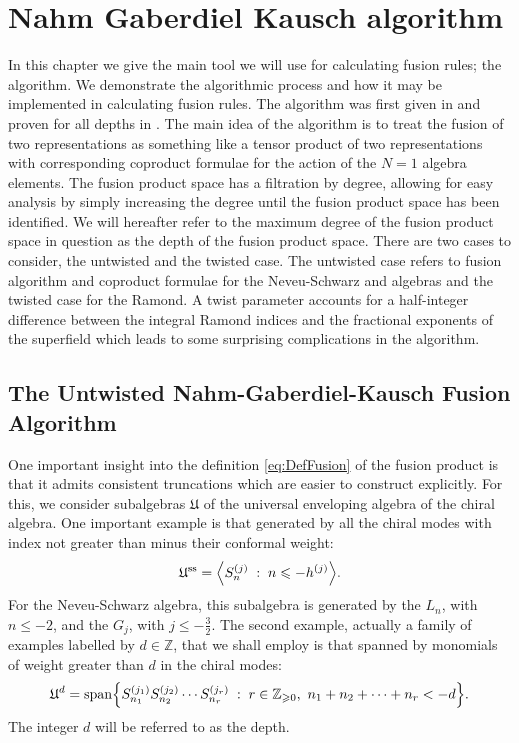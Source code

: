 \documentclass[a4paper,reqno,12pt]{report}
\theoremstyle{definition}
\numberwithin{equation}{section}
\let\originalleft\left     %
\let\originalright\right
\renewcommand{\left}{\mathopen{}\mathclose\bgroup\originalleft}
\renewcommand{\right}{\aftergroup\egroup\originalright}
\newcommand{\alg}[1]{\mathfrak{#1}} %
\newcommand{\set}[1]{\left\{ #1 \right\}}
\newcommand{\st}{\mspace{5mu} : \mspace{5mu}} %
\newcommand{\ZZ}{\mathbb{Z}}
\newcommand{\spsub}[1]{#1^{\text{ss}}}       %
\newcommand{\uea}{universal enveloping algebra}
\newcommand{\NGK}{Nahm-Gaberdiel-Kausch}
\newcommand{\ns}{Neveu-Schwarz}
\newcommand{\ram}{Ramond}
\DeclareMathOperator{\vspn}{span}
\renewcommand{\ge}{\geqslant}
\renewcommand{\le}{\leqslant}
\theoremstyle{plain}
\begin{document}
\chapter{Nahm Gaberdiel Kausch algorithm}

In this chapter we give the main tool we will use for calculating fusion rules; the \ngk{} algorithm. We demonstrate the algorithmic process and how it may be implemented in calculating fusion rules. The algorithm was first given in \cite{NahQua94} and proven for all depths in \cite{GabInd96}. The main idea of the algorithm is to treat the fusion of two representations as something like a tensor product of two representations with corresponding coproduct formulae for the action of the $N=1$ algebra elements. The fusion product space has a filtration by degree, allowing for easy analysis by simply increasing the degree until the fusion product space has been identified. We will hereafter refer to the maximum degree of the fusion product space in question as the depth of the fusion product space. There are two cases to consider, the untwisted and the twisted case. The untwisted case refers to fusion algorithm and coproduct formulae for the \ns{} and \vir{} algebras and the twisted case for the \ram{}. A  twist parameter accounts for a half-integer difference between the integral \ram{} indices and the fractional exponents of the superfield which leads to some surprising complications in the algorithm.

\section{The Untwisted \NGK{} Fusion Algorithm} \label{app:NGK}

One important insight \cite{NahQua94,GabInd96} into the definition \eqref{eq:DefFusion} of the fusion product is that it admits consistent truncations which are easier to construct explicitly.  For this, we consider subalgebras $\alg{U}$ of the \uea{} of the chiral algebra.  One important example is that generated by all the chiral modes with index not greater than minus their conformal weight:
\begin{equation}
\spsub{\alg{U}} = \left\langle S^{(j)}_n \st n \le -h^{(j)} \right\rangle.
\end{equation}
For the \ns{} algebra, this subalgebra is generated by the $L_n$, with $n \le -2$, and the $G_j$, with $j \le -\frac{3}{2}$.  The second example, actually a family of examples labelled by $d \in \ZZ$, that we shall employ is that spanned by monomials of weight greater than $d$ in the chiral modes:
\begin{equation}
\alg{U}^d = \vspn \set{S^{(j_1)}_{n_1} S^{(j_2)}_{n_2} \cdots S^{(j_r)}_{n_r} \st r \in \ZZ_{\ge 0}, \ n_1 + n_2 + \cdots + n_r < -d}.
\end{equation}
The integer $d$ will be referred to as the depth.
\end{document}
